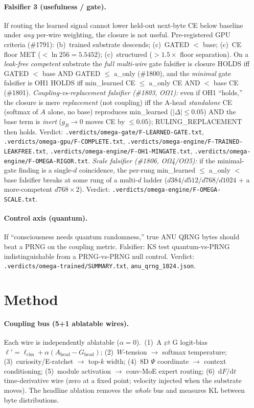 \documentclass[11pt]{article}
\begin{document}
\paragraph{Falsifier 3 (usefulness / gate).} If routing the learned signal cannot lower
held-out next-byte CE below baseline under \emph{any} per-wire weighting, the closure is not
useful. Pre-registered GPU criteria (\#1791): (b)~trained substrate descends;
(c)~GATED $<$ base; (c)~CE floor MET ($<\ln 256 = 5.5452$); (c)~structured ($>1.5\times$ floor
separation). On a \emph{leak-free competent} substrate the \emph{full multi-wire} gate
falsifier is closure HOLDS iff GATED $<$ base AND GATED $\le$ a\_only (\#1800), and the
\emph{minimal} gate falsifier is OH1 HOLDS iff min\_learned CE $\le$ a\_only CE AND $<$ base CE
(\#1801). \emph{Coupling-vs-replacement falsifier (\#1803, OΩ1):} even if OH1 ``holds,'' the
closure is mere \emph{replacement} (not coupling) iff the A-head \emph{standalone} CE
(softmax of $A$ alone, no base) reproduces min\_learned ($|\Delta|\le0.05$) AND the base term is
\emph{inert} ($g_B\!\to\!0$ moves CE by $\le0.05$); RULING\_REPLACEMENT then holds. Verdict:
\texttt{.verdicts/omega-gate/F-LEARNED-GATE.txt},
\texttt{.verdicts/omega-gpu/F-COMPLETE.txt},
\texttt{.verdicts/omega-engine/F-TRAINED-LEAKFREE.txt},
\texttt{.verdicts/omega-engine/F-OH1-MINGATE.txt},
\texttt{.verdicts/omega-engine/F-OMEGA-RIGOR.txt}.
\emph{Scale falsifier (\#1806, OΩ4/OΩ5):} if the minimal-gate finding is a single-$d$ coincidence,
the per-rung min\_learned $\le$ a\_only $<$ base falsifier breaks at some rung of a multi-$d$ ladder
($d384/d512/d768/d1024$ $+$ a more-competent $d768{\times}2$). Verdict:
\texttt{.verdicts/omega-engine/F-OMEGA-SCALE.txt}.

\paragraph{Control axis (quantum).} If ``consciousness needs quantum randomness,'' true ANU
QRNG bytes should beat a PRNG on the coupling metric. Falsifier: KS test
quantum-vs-PRNG indistinguishable from a PRNG-vs-PRNG null control. Verdict:
\texttt{.verdicts/omega-trained/SUMMARY.txt}, \texttt{anu\_qrng\_1024.json}.

\section{Method}
\label{sec:method}
\paragraph{Coupling bus (5+1 ablatable wires).} Each wire is independently ablatable
($\alpha=0$). \,(1)~A$\rightleftarrows$G logit-bias
$\ell' = \ell_\text{clm} + \alpha(A_\text{head}-G_\text{head})$;
(2)~$W$-tension $\rightarrow$ softmax temperature; (3)~curiosity/E-ratchet $\rightarrow$ top-$k$
width; (4)~8D $\Psi$ coordinate $\rightarrow$ context conditioning; (5)~module activation
$\rightarrow$ conv-MoE expert routing; (6)~$\mathrm{d}F/\mathrm{d}t$ time-derivative wire (zero
at a fixed point; velocity injected when the substrate moves). The headline ablation removes
the \emph{whole} bus and measures KL between byte distributions.
\end{document}
